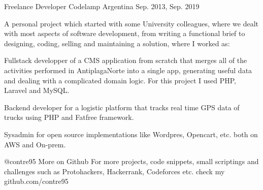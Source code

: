

\begin{cventries}
 \cventry
 {Freelance Developer} %
 {Codelamp} %
 {Argentina} %
 {Sep. 2013, Sep. 2019} %
 {
   {A personal project which started with some University colleagues, where we dealt with most aspects of software development, from writing a functional brief to designing, coding, selling and maintaining a solution, where I worked as: }
   \linebreak
  \begin{cvitems}
    \item {Fullstack developper of a CMS application from scratch that merges all of the activities performed in AntiplagaNorte into a single app, generating useful data and dealing with a complicated domain logic. For this project I used PHP, Laravel and MySQL.}
    \item {Backend developer for a logistic platform that tracks real time GPS data of trucks using PHP and Fatfree framework.}
    \item {Sysadmin for open source implementations like Wordpres, Opencart, etc. both on AWS and On-prem.}
  \end{cvitems}
}

  \cventry
      {@contre95} %
      {More on Github} %
      {} %
      {} %
      {For more projects, code snippets, small scriptings and challenges such as Protohackers, Hackerrank, Codeforces etc. check my github.com/contre95}

\end{cventries}
